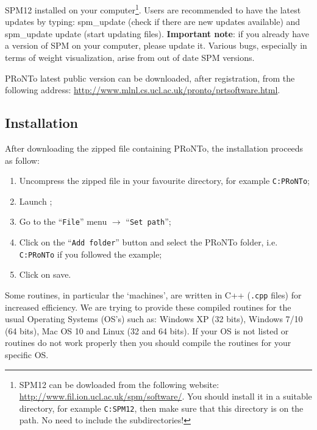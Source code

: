 \item SPM12 \cite{SPM8} installed on your computer\footnote{SPM12 can be dowloaded from the following website: \url{http://www.fil.ion.ucl.ac.uk/spm/software/}.  You should install it in a suitable directory, for example {\tt C:\bslash SPM12\bslash }, then make sure that this directory is on the \matlab{} path. No need to include the subdirectories!}. Users are recommended to have the latest updates by typing: spm\_update (check if there are new updates available) and spm\_update update (start updating files). \textbf{Important note}: if you already have a version of SPM on your computer, please update it. Various bugs, especially in terms of weight visualization, arise from out of date SPM versions.
\ei

PRoNTo latest public version can be downloaded, after registration, from the following address: \url{http://www.mlnl.cs.ucl.ac.uk/pronto/prtsoftware.html}.


\subsection{Installation}

After downloading the zipped file containing PRoNTo, the installation proceeds as follow:
\begin{enumerate}\addtolength{\itemsep}{-1\baselineskip}
\item	Uncompress the zipped file in your favourite directory, for example {\tt C:\bslash PRoNTo\bslash };\\
\item	Launch \matlab;\\
\item	Go to the ``{\tt File}'' menu $\rightarrow$ ``{\tt Set path}'';\\
\item	Click on the ``{\tt Add folder}'' button and select the PRoNTo folder, i.e. {\tt C:\bslash PRoNTo\bslash } if you followed the example;\\
\item	Click on save.
\end{enumerate}

Some routines, in particular the `machines', are written in C++ ({\tt .cpp} files) for increased efficiency. We are trying to provide these compiled routines for the usual Operating Systems (OS's) such as: Windows XP (32 bits), Windows 7/10 (64 bits), Mac OS 10 and Linux (32 and 64 bits). If your OS is not listed or routines do not work properly then you should compile the routines for your specific OS. 

